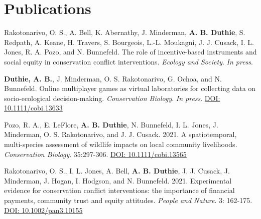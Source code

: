 \documentclass[letterpaper]{article}
\begin{document}
\section*{Publications}
\begin{etaremune}
\item Rakotonarivo, O. S., A. Bell, K. Abernathy, J. Minderman, {\bf A. B. Duthie}, S. Redpath, A. Keane, H. Travers, S. Bourgeois, L.-L. Moukagni, J. J. Cusack, I. L. Jones, R. A. Pozo, and N. Bunnefeld. The role of incentive-based instruments and social equity in conservation conflict interventions. {\it Ecology and Society}. {\it In press}.
\item {\bf Duthie, A. B.}, J. Minderman, O. S. Rakotonarivo, G. Ochoa, and N. Bunnefeld. Online multiplayer games as virtual laboratories for collecting data on socio-ecological decision-making. {\it Conservation Biology}. {\it In press}. \href{https://doi.org/10.1111/cobi.13633}{DOI: 10.1111/cobi.13633}
\item Pozo, R. A., E. LeFlore, {\bf A. B. Duthie}, N. Bunnefeld, I. L. Jones, J. Minderman, O. S. Rakotonarivo, and J. J. Cusack. 2021. A spatiotemporal, multi-species assessment of wildlife impacts on local community livelihoods. {\it Conservation Biology}. 35:297-306. \href{https://doi.org/10.1111/cobi.13565} {DOI: 10.1111/cobi.13565}
\item Rakotonarivo, O. S., I. L. Jones, A. Bell, {\bf A. B. Duthie}, J. J. Cusack, J. Minderman, J. Hogan, I. Hodgson, and N. Bunnefeld. 2021. Experimental evidence for conservation conflict interventions: the importance of financial payments, community trust and equity attitudes. {\it People and Nature}. 3: 162-175. \href{https://doi.org/10.1002/pan3.10155}{DOI: 10.1002/pan3.10155}

\end{etaremune}
\end{document}
